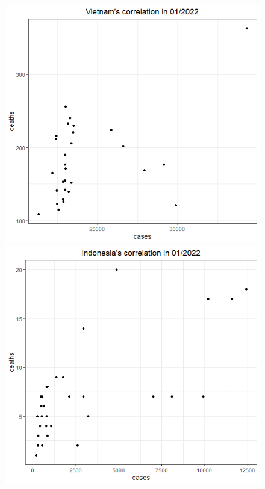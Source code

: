 \documentclass[a4paper]{article}
\theoremstyle{definition}
\begin{document}
\begin{enumerate}[1)]
\begin{figure}[H]
\begin{center}
        \includegraphics[scale = 0.3]{ix/ix.2/VN_01_2022.png}
        \includegraphics[scale = 0.3]{ix/ix.2/IDN_01_2022.png}

\end{center}
\end{figure}
\end{enumerate}
\end{document}
